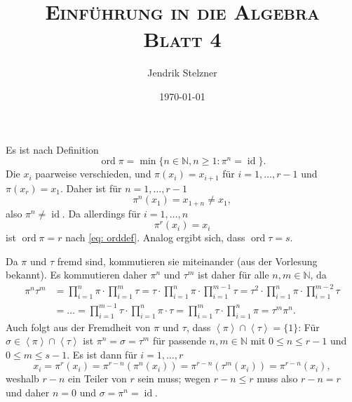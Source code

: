 \documentclass[a4paper,10pt]{article}
\title{\textsc{Einführung in die Algebra \\ \Large Blatt 4}}
\author{Jendrik Stelzner}
\date{\today}
\theoremstyle{definition}
\newcommand{\N}{\mathbb{N}}
\newcommand{\id}{\operatorname{id}}
\newcommand{\ord}{\operatorname{ord}}
\newcommand{\gen}[1]{\left\langle#1\right\rangle}
\begin{document}
\maketitle





\section{}





\section{}


\subsection{}\label{ssc: zykelordnung}
Es ist nach Definition
\begin{equation}\label{eq: orddef}
 \ord \pi = \min\{n \in \N, n \geq 1 : \pi^n = \id \}.
\end{equation}
Die $x_i$ paarweise verschieden, und $\pi(x_i) = x_{i+1}$ für $i=1,\ldots,r-1$ und $\pi(x_r) = x_1$. Daher ist für $n=1,\ldots,r-1$
\[
 \pi^n(x_1) = x_{1+n} \neq x_1,
\]
also $\pi^n \neq \id$. Da allerdings für $i=1,\ldots,n$
\[
 \pi^r(x_i) = x_i 
\]
ist $\ord \pi = r$ nach \eqref{eq: orddef}. Analog ergibt sich, dass $\ord \tau = s$.

Da $\pi$ und $\tau$ fremd sind, kommutieren sie miteinander (aus der Vorlesung bekannt). Es kommutieren daher $\pi^n$ und $\tau^m$ ist daher für alle $n,m \in \N$, da
\begin{align*}
 \pi^n \tau^m
 &= \prod_{i=1}^n \pi \cdot \prod_{i=1}^m \tau
 = \tau \cdot \prod_{i=1}^n \pi \cdot \prod_{i=1}^{m-1} \tau
 = \tau^2 \cdot \prod_{i=1}^n \pi \cdot \prod_{i=1}^{m-2} \tau \\
 &= \ldots
 = \prod_{i=1}^{m-1} \tau \cdot \prod_{i=1}^n \pi \cdot \tau
 = \prod_{i=1}^m \tau \cdot \prod_{i=1}^n \pi
 = \tau^m \pi^n.
\end{align*}
Auch folgt aus der Fremdheit von $\pi$ und $\tau$, dass $\gen{\pi} \cap \gen{\tau} = \{1\}$: Für $\sigma \in \gen{\pi} \cap \gen{\tau}$ ist $\pi^n = \sigma = \tau^m$ für passende $n,m \in \N$ mit $0 \leq n \leq r-1$ und $0 \leq m \leq s-1$. Es ist dann für $i=1,\ldots,r$
\[
 x_i = \pi^{r}(x_i) = \pi^{r-n}(\pi^n(x_i)) = \pi^{r-n}(\tau^m(x_i)) = \pi^{r-n}(x_i),
\]
weshalb $r-n$ ein Teiler von $r$ sein muss; wegen $r-n \leq r$ muss also $r-n = r$ und daher $n=0$ und $\sigma = \pi^n = \id$.
\end{document}
